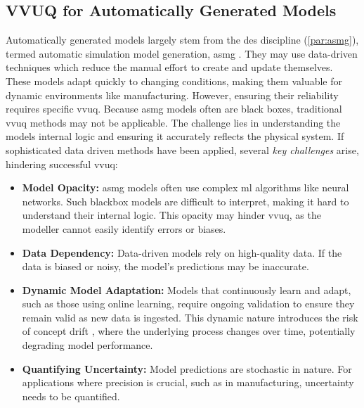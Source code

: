 \subsection{VVUQ for Automatically Generated Models}
\label{sec:requirements-automatically-generated-models}
Automatically generated models largely stem from the \gls{des} discipline (\autoref{par:asmg}), termed automatic simulation model generation, \gls{asmg} \autocite{mildeautomated,Charpentier2014}. They may use data-driven techniques which reduce the manual effort to create and update themselves. These models adapt quickly to changing conditions, making them valuable for dynamic environments like manufacturing. However, ensuring their reliability requires specific \gls{vvuq}. Because \gls{asmg} models often are black boxes, traditional \gls{vvuq} methods may not be applicable. The challenge lies in understanding the models internal logic and ensuring it accurately reflects the physical system. If sophisticated data driven methods have been applied, several \textit{key challenges} arise, hindering successful \gls{vvuq}:

\begin{itemize}
  \item \textbf{Model Opacity:} \gls{asmg} models often use complex \gls{ml} algorithms like neural networks. Such blackbox models are difficult to interpret, making it hard to understand their internal logic. This opacity may hinder \gls{vvuq}, as the modeller cannot easily identify errors or biases.
  \item \textbf{Data Dependency:} Data-driven models rely on high-quality data. If the data is biased or noisy, the model's predictions may be inaccurate.
  \item \textbf{Dynamic Model Adaptation:} Models that continuously learn and adapt, such as those using online learning, require ongoing validation to ensure they remain valid as new data is ingested. This dynamic nature introduces the risk of concept drift \autocite{lu2018learning}, where the underlying process changes over time, potentially degrading model performance.
  \item \textbf{Quantifying Uncertainty:} Model predictions are stochastic in nature. For applications where precision is crucial, such as in manufacturing, uncertainty needs to be quantified.
\end{itemize}

